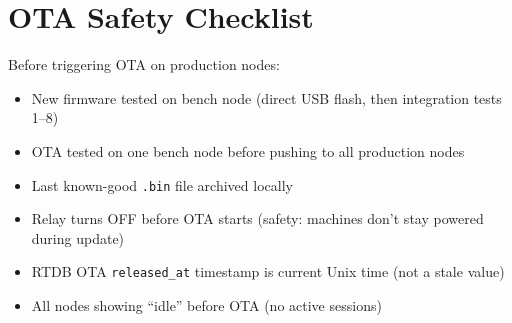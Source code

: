 \section{OTA Safety Checklist}

Before triggering OTA on production nodes:
\begin{itemize}[leftmargin=1.5em]
    \item[ ] New firmware tested on bench node (direct USB flash, then integration tests 1--8)
    \item[ ] OTA tested on one bench node before pushing to all production nodes
    \item[ ] Last known-good \texttt{.bin} file archived locally
    \item[ ] Relay turns OFF before OTA starts (safety: machines don't stay powered during update)
    \item[ ] RTDB OTA \texttt{released\_at} timestamp is current Unix time (not a stale value)
    \item[ ] All nodes showing ``idle'' before OTA (no active sessions)
\end{itemize}
